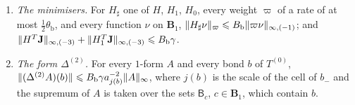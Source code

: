 \documentclass[11pt]{preprint}
\DeclarePairedDelimiter{\norm}{\lVert}{\rVert}
\numberwithin{equation}{section}
\begin{document}
\begin{proposition}
\begin{enumerate}[label=(\roman*)]
\item \emph{The minimisers.} For $H_\sharp$ one of $H$, $H_1$, $H_0$, every weight $\varpi$ of a rate of at most $\frac{1}{2}\theta_{\mathrm b}$, and every function $\nu$ on $\mathbf B_1$, $\norm{H_\sharp\nu}_\varpi \leqslant B_{\mathrm b}\norm{\varpi\nu}_{\infty,(-1)}$; and $\norm{H^T\mathbf J}_{\infty,(-3)} + \norm{H_1^T\mathbf J}_{\infty,(-3)} \leqslant B_{\mathrm b}\gamma$.
\item \emph{The form $\Delta^{(2)}$.} For every $1$-form $A$ and every bond $b$ of $T^{(0)}$, $\norm{(\Delta^{(2)}A)(b)} \leqslant B_{\mathrm b}\gamma a_{j(b)}^{-2}\norm A_\infty$, where $j(b)$ is the scale of the cell of $b_-$ and the supremum of $A$ is taken over the sets $\mathsf B_c$, $c \in \mathbf B_1$, which contain $b$.
\end{enumerate}
\end{proposition}
\end{document}
